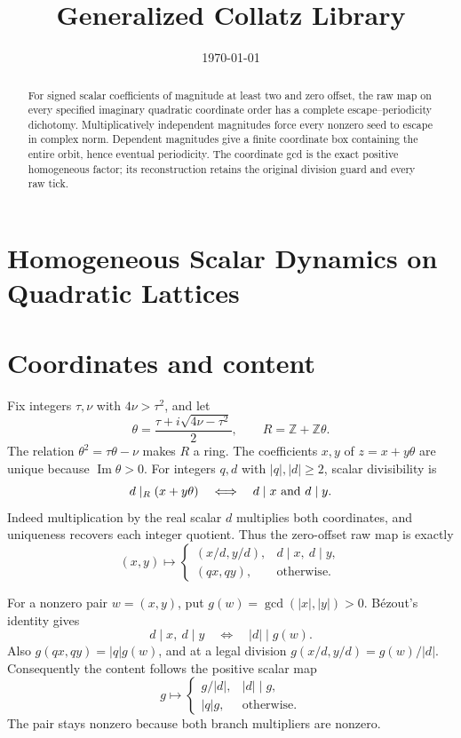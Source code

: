 \documentclass[11pt,letterpaper]{article}
\title{Generalized Collatz Library}
\author{}
\date{\today}
\newcommand{\Z}{\mathbb{Z}}
\begin{document}
\maketitle
\section*{Homogeneous Scalar Dynamics on Quadratic Lattices}

\begin{abstract}
For signed scalar coefficients of magnitude at least two and zero offset, the raw map on every specified imaginary quadratic coordinate order has a complete escape--periodicity dichotomy. Multiplicatively independent magnitudes force every nonzero seed to escape in complex norm. Dependent magnitudes give a finite coordinate box containing the entire orbit, hence eventual periodicity. The coordinate gcd is the exact positive homogeneous factor; its reconstruction retains the original division guard and every raw tick.
\end{abstract}

\section{Coordinates and content}

Fix integers \(\tau,\nu\) with \(4\nu>\tau^2\), and let
\[
\theta=\frac{\tau+i\sqrt{4\nu-\tau^2}}2,\qquad R=\Z+\Z\theta.
\]
The relation \(\theta^2=\tau\theta-\nu\) makes \(R\) a ring.
The coefficients \(x,y\) of \(z=x+y\theta\) are unique because \(\operatorname{Im}\theta>0\).
For integers \(q,d\) with \(|q|,|d|\ge2\), scalar divisibility is
\[
d\mid_R (x+y\theta)\quad\Longleftrightarrow\quad d\mid x\ \hbox{and}\ d\mid y.
\]
Indeed multiplication by the real scalar \(d\) multiplies both coordinates, and uniqueness recovers each integer quotient.
Thus the zero-offset raw map is exactly
\[
(x,y)\longmapsto
\begin{cases}
(x/d,y/d),&d\mid x,\ d\mid y,\\
(qx,qy),&\text{otherwise}.
\end{cases}
\]

For a nonzero pair \(w=(x,y)\), put \(g(w)=\gcd(|x|,|y|)>0\).
B\'ezout's identity gives
\[
d\mid x,\ d\mid y\quad\Longleftrightarrow\quad |d|\mid g(w).
\]
Also \(g(qx,qy)=|q|g(w)\), and at a legal division
\(g(x/d,y/d)=g(w)/|d|\).
Consequently the content follows the positive scalar map
\[
g\longmapsto
\begin{cases}
g/|d|,&|d|\mid g,\\
|q|g,&\text{otherwise}.
\end{cases}
\]
The pair stays nonzero because both branch multipliers are nonzero.
\end{document}
